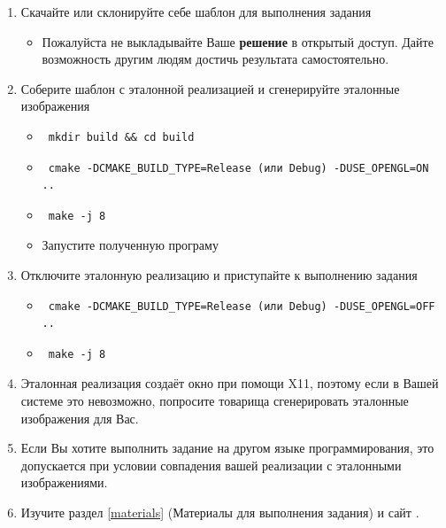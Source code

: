 \documentclass[12pt,subf,href,colorlinks=true]{article}
\begin{document}
\begin{enumerate}
\item Скачайте или склонируйте себе шаблон для выполнения задания \cite{ourtemplate}
  \begin{itemize}
	\item Пожалуйста не выкладывайте Ваше \textbf{решение} в открытый доступ. Дайте возможность другим людям достичь результата самостоятельно.
  \end{itemize}

\item Соберите шаблон с эталонной реализацией и сгенерируйте эталонные изображения
  \begin{itemize}
  \item \begin{verbatim} mkdir build && cd build \end{verbatim}
  \item \begin{verbatim} cmake -DCMAKE_BUILD_TYPE=Release (или Debug) -DUSE_OPENGL=ON .. \end{verbatim}
  \item \begin{verbatim} make -j 8 \end{verbatim}
  \item Запустите полученную програму
  \end{itemize}

\item Отключите эталонную реализацию и приступайте к выполнению задания
   \begin{itemize}
  	\item \begin{verbatim} cmake -DCMAKE_BUILD_TYPE=Release (или Debug) -DUSE_OPENGL=OFF .. \end{verbatim}
  	\item \begin{verbatim} make -j 8 \end{verbatim}
  \end{itemize}

\item Эталонная реализация создаёт окно при помощи X11, поэтому если в Вашей системе это невозможно, попросите товарища сгенерировать эталонные изображения для Вас.

\item Если Вы хотите выполнить задание на другом языке программирования, это допускается при условии совпадения вашей реализации с эталонными изображениями. 

\item Изучите раздел \ref{materials} (Материалы для выполнения задания) и сайт \cite{scratchpixel}.

\end{enumerate}
\end{document}
